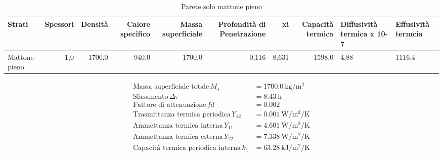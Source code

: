 \begin{table}
\centering
\caption{Parete solo mattone pieno}
\begin{tabular}{lrrrrrrr}
\toprule
        Strati & Spessori & Densità & Calore specifico & Massa superficiale & Profondità di Penetrazione &     xi & Capacità termica & Diffusività termica x 10-7 & Effusività termcia \\
\midrule
 Mattone pieno &      1,0 &  1700,0 &            940,0 &             1700,0 &                      0,116 &  8,631 &           1598,0 &                       4,88 &             1116,4 \\
\bottomrule
\end{tabular}
\end{table}

\begin{flushleft}
\begin{align*}
\text{Massa superficiale totale} \, M_s &= \SI{1700.0}{\kilo\gram\per\metre\squared}\\
\text{Sfasamento} \, \Delta\tau &= \SI{8.43}{\hour}\\
\text{Fattore di attenuazione} \, fd &= \SI{0.002}{}\\
\text{Trasmittanza termica periodica} \, Y_{12} &= \SI{0.001}{\watt\per\metre\squared\per\kelvin}\\
\text{Ammettanza termica interna} \, Y_{11} &= \SI{4.601}{\watt\per\metre\squared\per\kelvin}\\
\text{Ammettanza termica esterna} \, Y_{22} &= \SI{7.338}{\watt\per\metre\squared\per\kelvin}\\
\text{Capacità termica periodica interna} \, k_1 &= \SI{63.28}{\kilo\joule\per\metre\squared\per\kelvin}\\
\end{align*}
\end{flushleft}
